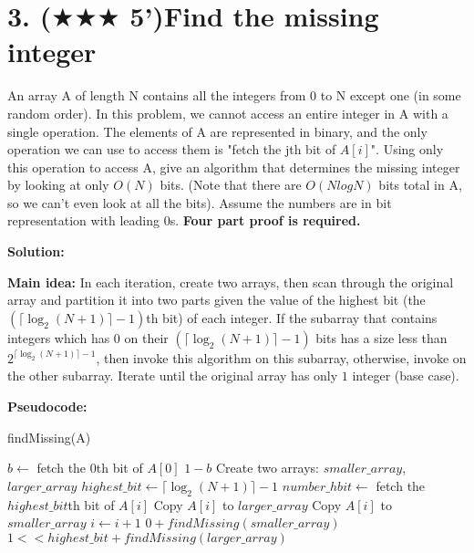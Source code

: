 \documentclass{article}
\begin{document}
\section*{3. ($\bigstar\bigstar\bigstar$ 5')Find the missing integer}
An array A of length N contains all the integers from 0 to N except one (in some random
order). In this problem, we cannot access an entire integer in A with a single operation.
The elements of A are represented in binary, and the only operation we can use to access
them is "fetch the jth bit of $A[i]$". Using only this operation to access A, give an algorithm
that determines the missing integer by looking at only $O(N)$ bits. (Note that there are
$O(N logN)$ bits total in A, so we can't even look at all the bits). Assume the numbers are
in bit representation with leading 0s. {\textbf{Four part proof is required.}}
{\color{blue}
\par\textbf{Solution: }
\par\textbf{Main idea: }In each iteration, create two arrays, then scan through the original array and partition it into two parts given the value of the highest bit (the $(\lceil \log_2{(N+1)}\rceil-1)$th bit) of each integer. If the subarray that contains integers which has $0$ on their $(\lceil \log_2{(N+1)}\rceil-1)$ bits has a size less than $2^{\lceil \log_2{(N+1)}\rceil-1}$, then invoke this algorithm on this subarray, otherwise, invoke on the other subarray. Iterate until the original array has only $1$ integer (base case).\\

\par\textbf{Pseudocode: }
\begin{algorithm}
	\caption{findMissing(A)}
	\label{alg2}
	\color{blue}
	\begin{algorithmic}
			\STATE $b \gets$ fetch the $0$th bit of $A[0]$
			\RETURN $1-b$
		\ENDIF
		\STATE Create two arrays: $smaller\_array$, $larger\_array$
		\STATE $highest\_bit \gets \lceil \log_2{(N+1)}\rceil-1$
	  	\STATE $number\_hbit \gets$ fetch the $highest\_bit$th bit of $A[i]$
				\STATE Copy $A[i]$ to $larger\_array$
			\ELSE
				\STATE Copy $A[i]$ to $smaller\_array$
			\ENDIF
		\STATE $i \gets i + 1$
		\ENDWHILE
			\RETURN $0+findMissing(smaller\_array)$
		\ELSE
			\RETURN $1 << highest\_bit+findMissing(larger\_array)$
		\ENDIF
	\end{algorithmic}
\end{algorithm}

}
\end{document}
